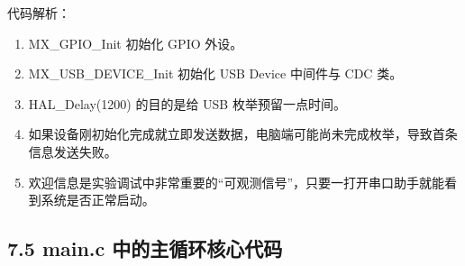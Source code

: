 \documentclass[
  chinese,
  UTF8,
  oneside,
  openany]{ctexbook}
\providecommand{\tightlist}{%
  \setlength{\itemsep}{0pt}\setlength{\parskip}{0pt}}
\begin{document}
代码解析：

\begin{enumerate}
\def\labelenumi{\arabic{enumi}.}
\tightlist
\item
  MX\_GPIO\_Init 初始化 GPIO 外设。
\item
  MX\_USB\_DEVICE\_Init 初始化 USB Device 中间件与 CDC 类。
\item
  HAL\_Delay(1200) 的目的是给 USB 枚举预留一点时间。
\item
  如果设备刚初始化完成就立即发送数据，电脑端可能尚未完成枚举，导致首条信息发送失败。
\item
  欢迎信息是实验调试中非常重要的``可观测信号''，只要一打开串口助手就能看到系统是否正常启动。
\end{enumerate}

\subsection{7.5 main.c
中的主循环核心代码}\label{main.c-ux4e2dux7684ux4e3bux5faaux73afux6838ux5fc3ux4ee3ux7801}
\end{document}
